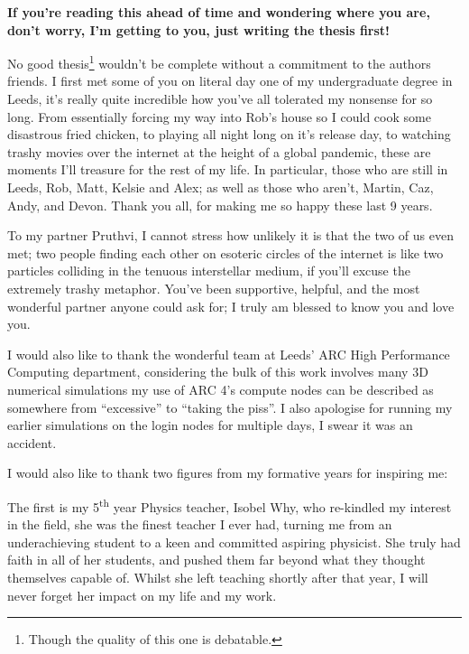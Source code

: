 

\begin{acknowledgements}      %

\setlength{\parindent}{17.62482pt}
\setlength{\parskip}{0.0pt plus 1.0pt}

\textbf{If you're reading this ahead of time and wondering where you are, don't worry, I'm getting to you, just writing the thesis first!}

No good thesis\footnote{Though the quality of this one is debatable.} wouldn't be complete without a commitment to the authors friends.
I first met some of you on literal day one of my undergraduate degree in Leeds, it's really quite incredible how you've all tolerated my nonsense for so long.
From essentially forcing my way into Rob's house so I could cook some disastrous fried chicken, to playing  all night long on it's release day, to watching trashy movies over the internet at the height of a global pandemic, these are moments I'll treasure for the rest of my life.
In particular, those who are still in Leeds, Rob, Matt, Kelsie and Alex; as well as those who aren't, Martin, Caz, Andy, and Devon. 
Thank you all, for making me so happy these last 9 years.

To my partner Pruthvi, I cannot stress how unlikely it is that the two of us even met; two people finding each other on esoteric circles of the internet is like two particles colliding in the tenuous interstellar medium, if you'll excuse the extremely trashy metaphor.
You've been supportive, helpful, and the most wonderful partner anyone could ask for; I truly am blessed to know you and love you.

I would also like to thank the wonderful team at Leeds' ARC High Performance Computing department, considering the bulk of this work involves many 3D numerical simulations my use of ARC 4's compute nodes can be described as somewhere from ``excessive'' to ``taking the piss''.
I also apologise for running my earlier simulations on the login nodes for multiple days, I swear it was an accident.

I would also like to thank two figures from my formative years for inspiring me:

The first is my 5\textsuperscript{th} year Physics teacher, Isobel Why, who re-kindled my interest in the field, she was the finest teacher I ever had, turning me from an underachieving student to a keen and committed aspiring physicist.
She truly had faith in all of her students, and pushed them far beyond what they thought themselves capable of.
Whilst she left teaching shortly after that year, I will never forget her impact on my life and my work.


\end{acknowledgements}
